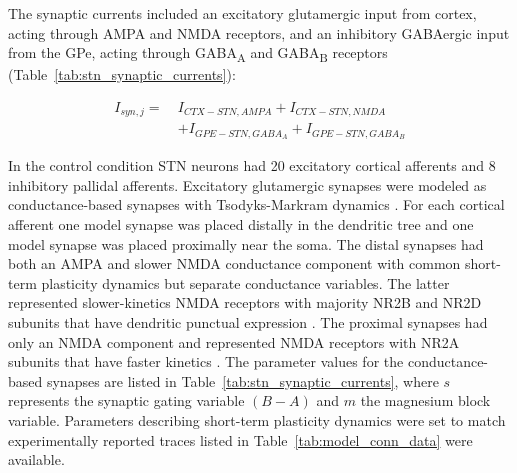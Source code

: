 %
The synaptic currents included an excitatory glutamergic input from cortex, acting through AMPA and NMDA receptors, and an inhibitory GABAergic input from the GPe, acting through GABA\textsubscript{A} and GABA\textsubscript{B} receptors (Table~\ref{tab:stn_synaptic_currents}):

\begin{equation}
\begin{split}
    I_{syn,j} = \ & I_{CTX−STN,AMPA} + I_{CTX−STN,NMDA} \\
              & + I_{GPE−STN,GABA_A} + I_{GPE−STN,GABA_B}
\end{split}
\end{equation}

In the control condition STN neurons had 20 excitatory cortical afferents and 8 inhibitory
pallidal afferents. Excitatory glutamergic synapses were modeled as conductance-based
synapses with Tsodyks-Markram dynamics \cite{tsodyks_neural_1998}. For each cortical
afferent one model synapse was placed distally in the dendritic tree and one model synapse was
placed proximally near the soma. The distal synapses had both an AMPA and slower NMDA
conductance component with common short-term plasticity dynamics but separate conductance
variables. The latter represented slower-kinetics NMDA receptors with majority NR2B and
NR2D subunits that have dendritic punctual expression \cite{pan_neuronal_2016}. The
proximal synapses had only an NMDA component and represented NMDA receptors with NR2A
subunits that have faster kinetics \cite{pan_neuronal_2016}. The parameter values for the
conductance-based synapses are listed in Table~\ref{tab:stn_synaptic_currents},
where $s$ represents the synaptic gating variable $(B-A)$ and $m$ the magnesium
block variable.
Parameters describing short-term plasticity dynamics were set to match experimentally
reported traces listed in Table~\ref{tab:model_conn_data} were available.

%
%
%

%

